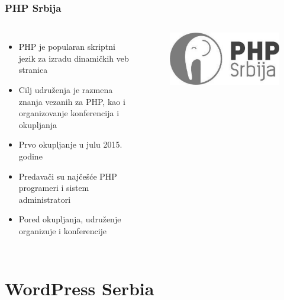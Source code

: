 \documentclass[hyperref={bookmarks=false},aspectratio=169]{beamer}
\begin{document}
\begin{frame}
\frametitle{PHP Srbija}

\begin{columns}[T]

\begin{itemize}
    \item PHP je popularan skriptni jezik za izradu dinamičkih veb stranica 
    \item Cilj udruženja je razmena znanja vezanih za PHP, kao i organizovanje konferencija i okupljanja
    \item Prvo okupljanje u julu 2015. godine
    \item Predavači su najčešće PHP programeri i sistem administratori
    \item Pored okupljanja, udruženje organizuje i konferencije
    
\end{itemize}

\begin{figure}
    \raggedleft
    \includegraphics[scale=0.15]{./images/php_gray.jpg}
\end{figure}

\end{columns}

\end{frame}

\section{WordPress Serbia}
\end{document}
